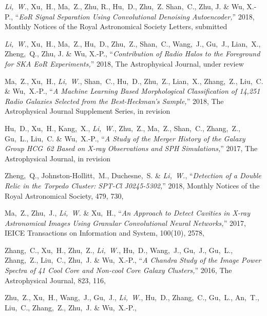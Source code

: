 \begin{publications}{99}
  \item \emph{Li,~W.}, Xu,~H., Ma,~Z., Zhu, R., Hu,~D., Zhu,~Z.
    Shan,~C., Zhu, J. \& Wu, X.-P.,
    \enquote{\it EoR Signal Separation Using Convolutional Denoising
      Autoencoder,}
    2018, Monthly Notices of the Royal Astronomical Society Letters,
    submitted
  \item \emph{Li,~W.}, Xu,~H., Ma,~Z., Hu,~D., Zhu,~Z., Shan,~C.,
    Wang,~J., Gu,~J., Lian,~X., Zheng,~Q., Zhu, J. \& Wu, X.-P.,
    \enquote{\it Contribution of Radio Halos to the Foreground for
      SKA EoR Experiments,}
    2018, The Astrophysical Journal,
    under review
  \item Ma,~Z., Xu,~H., \emph{Li,~W.}, Shan,~C., Hu,~D., Zhu,~Z.,
    Lian,~X., Zhang,~Z., Liu,~C. \& Wu,~X.-P.,
    \enquote{\it A Machine Learning Based Morphological Classification
      of 14,251 Radio Galaxies Selected from the Best-Heckman's Sample,}
    2018, The Astrophysical Journal Supplement Series,
    in revision
  \item Hu,~D., Xu,~H., Kang,~X., \emph{Li,~W.}, Zhu,~Z., Ma,~Z.,
    Shan,~C., Zhang,~Z., Gu,~L., Liu,~C. \& Wu,~X.-P.,
    \enquote{\it A Study of the Merger History of the Galaxy Group
      HCG~62 Based on X-ray Observations and SPH Simulations,}
    2017, The Astrophysical Journal,
    in revision
  \item Zheng,~Q., Johnston-Hollitt,~M., Duchesne,~S. \& \emph{Li,~W.},
    \enquote{\it Detection of a Double Relic in the Torpedo Cluster:
      SPT-Cl J0245-5302,}
    2018, Monthly Notices of the Royal Astronomical Society, 479, 730,
  \item Ma,~Z., Zhu,~J., \emph{Li,~W.} \& Xu,~H.,
    \enquote{\it An Approach to Detect Cavities in X-ray Astronomical
      Images Using Granular Convolutional Neural Networks,}
    2017, IEICE Transactions on Information and System, 100(10), 2578,
  \item Zhang,~C., Xu,~H., Zhu,~Z., \emph{Li,~W.}, Hu,~D., Wang,~J.,
    Gu,~J., Gu,~L., Zhang,~Z., Liu,~C., Zhu,~J. \& Wu,~X.-P.,
    \enquote{\it A Chandra Study of the Image Power Spectra of 41
      Cool Core and Non-cool Core Galaxy Clusters,}
    2016, The Astrophysical Journal, 823, 116,
  \item Zhu,~Z., Xu,~H., Wang,~J., Gu,~J., \emph{Li,~W.}, Hu,~D.,
    Zhang,~C., Gu,~L., An,~T., Liu,~C., Zhang,~Z., Zhu,~J. \& Wu,~X.-P.,

\end{publications}
